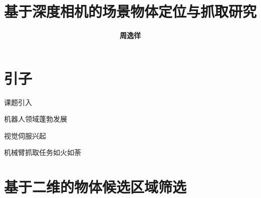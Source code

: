 \documentclass[xcolor=table,notheorems,compress,blue]{beamer}
\title{\textbf{\Huge{基于深度相机的场景物体定位与抓取研究}}}
\author{\textbf{\huge{周逸徉}}}
\begin{document}
\begin{frame}[plain]\transboxout
\titlepage
\end{frame}

\begin{frame}\transboxin
\begin{center}
\tableofcontents[hideallsubsections]
\end{center}
\end{frame}

\section{引子}
	\begin{frame}{课题引入}\transdissolve
		\begin{exampleblock}{机器人领域蓬勃发展}
			
		\end{exampleblock}
		\begin{exampleblock}{视觉伺服兴起}
			
		\end{exampleblock}
		\begin{exampleblock}{机械臂抓取任务如火如荼}
			
		\end{exampleblock}
	\end{frame}

\section{基于二维的物体候选区域筛选}
\end{document}
